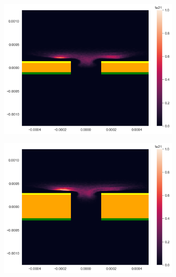 \begin{figure}
    \centering
    \begin{subfigure}[b]{0.475\textwidth}
        \centering
        \includegraphics[width=\textwidth]{chapter_4/figures/SRR_dielectric_1.png}
        \caption{}  
        \label{fig:SRR_dielectric_0.2mm}
    \end{subfigure}
    \hfill
    \begin{subfigure}[b]{0.475\textwidth}  
        \centering 
        \includegraphics[width=\textwidth]{chapter_4/figures/SRR_dielectric_2.png}
        \caption{}   
        \label{fig:SRR_dielectric_0.5mm}
    \end{subfigure}

\end{figure}
